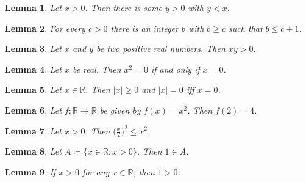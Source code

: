 \documentclass{article}
\newtheorem{lemma}{Lemma}
\begin{document}
\begin{lemma}\label{p13}
Let $x>0$. Then there is some $y>0$ with $y<x$.
\end{lemma}

\begin{lemma}\label{p14}
For every $c>0$ there is an integer $b$ with $b\ge c$ such that $b\le c+1$.
\end{lemma}

\begin{lemma}\label{p15}
Let $x$ and $y$ be two positive real numbers. Then $xy>0$.
\end{lemma}

\begin{lemma}\label{p16}
Let $x$ be real. Then $x^2=0$ if and only if $x=0$.
\end{lemma}

\begin{lemma}\label{p17}
Let $x \in \mathbb{R}$. Then $|x| \geqslant 0$ and $|x|=0$ iff $x=0$.
\end{lemma}

\begin{lemma}\label{p18}
Let $f\colon\mathbb{R}\rightarrow\mathbb{R}$ be given by $f(x)=x^2$. Then $f(2)=4$.
\end{lemma}

\begin{lemma}\label{p19}
Let $x>0$. Then $\bigg(\frac{x}{2}\bigg)^2\le x^2$.
\end{lemma}

\begin{lemma}\label{p20}
Let $A\coloneq\{x\in\mathbb{R}:x>0\}$. Then $1\in A$.
\end{lemma}

\begin{lemma}\label{p21}
If $x>0$ for any $x\in\mathbb{R}$, then $1>0$.
\end{lemma}
\end{document}
